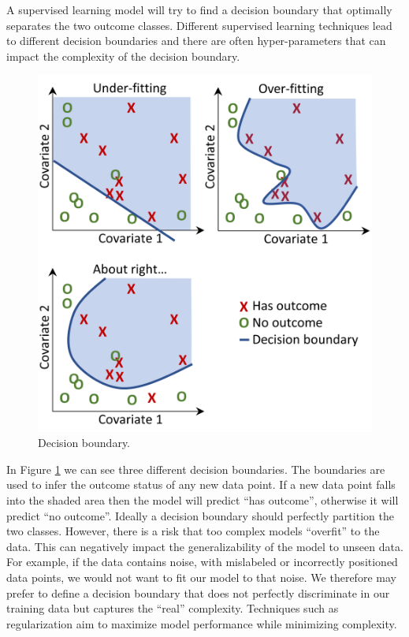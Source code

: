 \documentclass[11pt]{book}
\theoremstyle{definition}
\theoremstyle{definition}
\theoremstyle{definition}
\theoremstyle{remark}
\begin{document}
A supervised learning model will try to find a decision boundary that
optimally separates the two outcome classes. Different supervised
learning techniques lead to different decision boundaries and there are
often hyper-parameters that can impact the complexity of the decision
boundary. 

\begin{figure}

{\centering \includegraphics[width=0.8\linewidth]{images/PatientLevelPrediction/decisionBoundary} 

}

\caption{Decision boundary.}\label{fig:decisionBoundary}
\end{figure}

In Figure \ref{fig:decisionBoundary} we can see three different decision
boundaries. The boundaries are used to infer the outcome status of any
new data point. If a new data point falls into the shaded area then the
model will predict ``has outcome'', otherwise it will predict ``no
outcome''. Ideally a decision boundary should perfectly partition the
two classes. However, there is a risk that too complex models
``overfit'' to the data. This can negatively impact the generalizability
of the model to unseen data. For example, if the data contains noise,
with mislabeled or incorrectly positioned data points, we would not want
to fit our model to that noise. We therefore may prefer to define a
decision boundary that does not perfectly discriminate in our training
data but captures the ``real'' complexity. Techniques such as
regularization aim to maximize model performance while minimizing
complexity.
\end{document}
